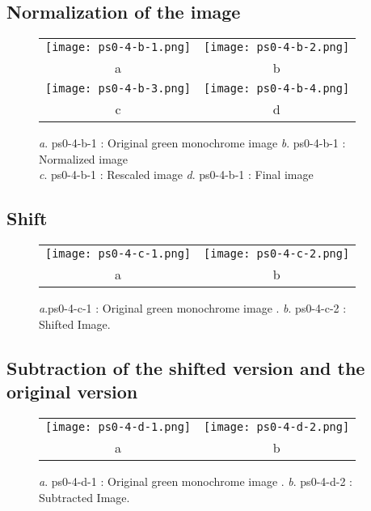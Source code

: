 \documentclass[a4paper,11pt]{article}
\begin{document}
\subsection{Normalization of the image}

 \begin{figure}[H]
\begin{center}
\begin{tabular}{cc}
	\texttt{[image: ps0-4-b-1.png]}&
	\texttt{[image: ps0-4-b-2.png]}\\
	a&b\\
	\texttt{[image: ps0-4-b-3.png]}&
	\texttt{[image: ps0-4-b-4.png]}\\
	c&d\\
\end{tabular}
\end{center}
\caption{ 
\textit{a}. ps0-4-b-1 : Original green monochrome image \textit{b}. ps0-4-b-1 : Normalized image\\
\textit{c}. ps0-4-b-1 : Rescaled image  \textit{d}. ps0-4-b-1 : Final image}
\label{ps0-4-b}
\end{figure}

\subsection{Shift}

 \begin{figure}[H]
\begin{center}
\begin{tabular}{cc}
	\texttt{[image: ps0-4-c-1.png]}&
	\texttt{[image: ps0-4-c-2.png]}\\
	a&b\\
\end{tabular}
\end{center}
\caption{ 
\textit{a}.ps0-4-c-1 : Original green monochrome image . \textit{b}. ps0-4-c-2 : Shifted Image.}
\label{ps0-4-c}
\end{figure}

\subsection{Subtraction of the shifted version and the original version}

 \begin{figure}[H]
\begin{center}
\begin{tabular}{cc}
	\texttt{[image: ps0-4-d-1.png]}&
	\texttt{[image: ps0-4-d-2.png]}\\
	a&b\\
\end{tabular}
\end{center}
\caption{ 
\textit{a}. ps0-4-d-1 : Original green monochrome image . \textit{b}. ps0-4-d-2 : Subtracted Image.}
\label{ps0-4-d}
\end{figure}
\end{document}
